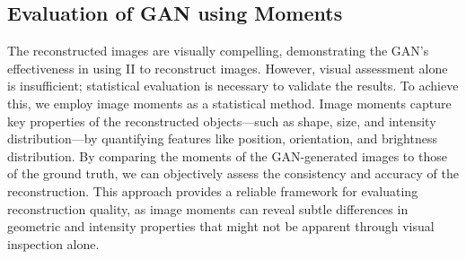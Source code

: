 \subsection{Evaluation of GAN using Moments}
The reconstructed images are visually compelling, demonstrating the GAN's effectiveness in using II to reconstruct images. However, visual assessment alone is insufficient; statistical evaluation is necessary to validate the results. To achieve this, we employ image moments as a statistical method. Image moments capture key properties of the reconstructed objects—such as shape, size, and intensity distribution—by quantifying features like position, orientation, and brightness distribution. By comparing the moments of the GAN-generated images to those of the ground truth, we can objectively assess the consistency and accuracy of the reconstruction. This approach provides a reliable framework for evaluating reconstruction quality, as image moments can reveal subtle differences in geometric and intensity properties that might not be apparent through visual inspection alone.

